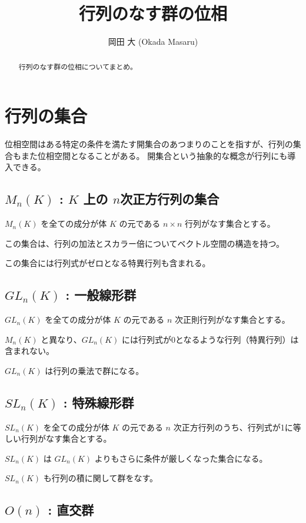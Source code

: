 \documentclass[uplatex,a4j,12pt,dvipdfmx]{jsarticle}
\title{
行列のなす群の位相
}
\author{
岡田 大 (Okada Masaru)
}
\begin{document}
\maketitle


\begin{abstract}
	行列のなす群の位相についてまとめ。
\end{abstract}

\section{行列の集合}

位相空間はある特定の条件を満たす開集合のあつまりのことを指すが、行列の集合もまた位相空間となることがある。
開集合という抽象的な概念が行列にも導入できる。

\subsection{$M_{n}(K)$ : $K$ 上の $n$次正方行列の集合}

$M_{n}(K)$ を全ての成分が体 $K$ の元である $n \times n$ 行列がなす集合とする。

この集合は、行列の加法とスカラー倍についてベクトル空間の構造を持つ。

この集合には行列式がゼロとなる特異行列も含まれる。

\subsection{$GL_{n}(K)$ : 一般線形群}

$GL_{n}(K)$ を全ての成分が体 $K$ の元である $n$ 次正則行列がなす集合とする。

$M_{n}(K)$ と異なり、$GL_{n}(K)$ には行列式が0となるような行列（特異行列）は含まれない。

$GL_{n}(K)$ は行列の乗法で群になる。

\subsection{$SL_{n}(K)$ : 特殊線形群}

$SL_{n}(K)$ を全ての成分が体 $K$ の元である $n$ 次正方行列のうち、行列式が1に等しい行列がなす集合とする。

$SL_{n}(K)$ は $GL_{n}(K)$ よりもさらに条件が厳しくなった集合になる。

$SL_{n}(K)$ も行列の積に関して群をなす。

\subsection{$O(n)$ : 直交群}
\end{document}
